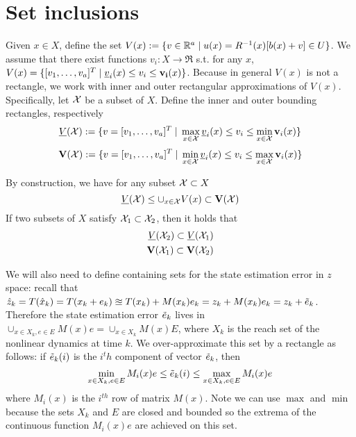 \section{Set inclusions}
\label{sec:set inclusions}


Given $x \in X$, define the set $V(x) := \{v \in \mathbb{R}^a \;|\; u(x) = R^{-1}(x)[b(x)+v] \in U\}$.
We assume that there exist functions $v_i: X \rightarrow \Re$ s.t. for any $x$, $V(x) = \{[v_1,\ldots,v_a]^T \;|\; \underline{v}_i(x) \leq v_i \leq \mathbf{v_i}(x) \}$.
Because in general $V(x)$ is not a rectangle, we work with inner and outer rectangular approximations of $V(x)$.
Specifically, let $\mathcal{X}$ be a subset of $X$.
Define the inner and outer bounding rectangles, respectively
\[\underline{V}(\mathcal{X}) := \{v=[v_1,\ldots,v_a]^T \;|\; \max_{x\in \mathcal{X}} \underline{v}_i(x)  \leq v_i \leq \min_{x \in \mathcal{X}} \mathbf{v}_i(x) \} \]
\[\mathbf{V}(\mathcal{X}) := \{v=[v_1,\ldots,v_a]^T \;|\; \min_{x\in \mathcal{X}} \underline{v}_i(x)  \leq v_i \leq \max_{x \in \mathcal{X}} \mathbf{v}_i(x) \} \]

By construction, we have for any subset $\mathcal{X} \subset X$
\begin{equation}
\label{eq:Vbounds}
\underline{V}(\mathcal{X}) \leq \cup_{x \in \mathcal{X}} V(x) \subset \mathbf{V}(\mathcal{X})
\end{equation}
If two subsets of $X$ satisfy $\mathcal{X}_1 \subset \mathcal{X}_2$, then it holds that 
\begin{eqnarray}
\label{eq:V inclusions}
\underline{V}(\mathcal{X}_2) \subset \underline{V}(\mathcal{X}_1)
\nonumber
\\
\mathbf{V}(\mathcal{X}_1) \subset \mathbf{V}(\mathcal{X}_2)
\end{eqnarray}

We will also need to define containing sets for the state estimation error in $z$ space:
recall that $\hat{z}_k = T(\hat{x}_k) = T(x_k + e_k) \approxeq T(x_k) + M(x_k)e_k = z_k + M(x_k)e_k = z_k + \tilde{e}_{k}$.
Therefore the state estimation error $\tilde{e}_{k}$ lives in $\cup_{x\in X_k, e \in E}M(x)e = \cup_{x \in X_k}M(x)E$, where $X_k$ is the reach set of the nonlinear dynamics at time $k$.
We over-approximate this set by a rectangle as follows: if $\tilde{e}_{k}(i)$ is the $i^th$ component of vector $\tilde{e}_{k}$, then 
\[\min_{x \in X_k, e \in E}M_i(x)e \leq \tilde{e}_{k}(i) \leq \max_{x \in X_k, e \in E} M_i(x)e\]
where $M_i(x)$ is the $i^{th}$ row of matrix $M(x)$.
Note we can use $\max$ and $\min$ because the sets $X_k$ and $E$ are closed and bounded so the extrema of the continuous function $M_i(x)e$ are achieved on this set.

